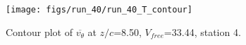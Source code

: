 \begin{figure}[H]
\centering
\texttt{[image: figs/run\_40/run\_40\_T\_contour]}
\caption{Contour plot of $\overline{v_{\theta}}$ at $z/c$=8.50, $V_{free}$=33.44, station 4.}
\label{fig:run_40_T_contour}
\end{figure}


